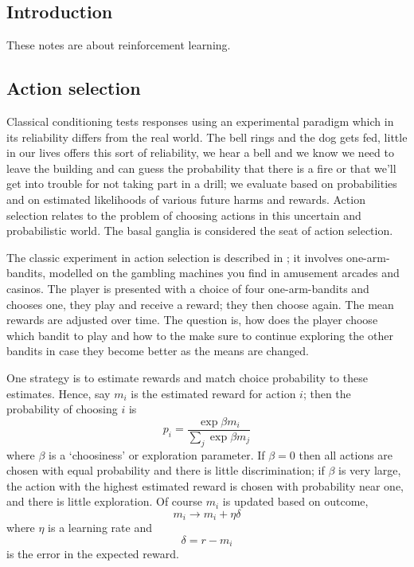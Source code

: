 \documentclass[11pt,a4paper]{scrartcl}
\begin{document}
\subsection*{Introduction}
These notes are about reinforcement learning.
\subsection*{Action selection}

Classical conditioning tests responses using an experimental paradigm
which in its reliability differs from the real world. The bell rings
and the dog gets fed, little in our lives offers this sort of
reliability, we hear a bell and we know we need to leave the building
and can guess the probability that there is a fire or that we'll get
into trouble for not taking part in a drill; we evaluate based on
probabilities and on estimated likelihoods of various future harms and
rewards. Action selection relates to the problem of choosing actions
in this uncertain and probabilistic world. The basal ganglia is
considered the seat of action selection.

The classic experiment in action selection is described in
\cite{DawEtAl2006a}; it involves one-arm-bandits, modelled on the
gambling machines you find in amusement arcades and casinos. The
player is presented with a choice of four one-arm-bandits and chooses
one, they play and receive a reward; they then choose again. The mean
rewards are adjusted over time. The question is, how does the player
choose which bandit to play and how to the make sure to continue
exploring the other bandits in case they become better as the means
are changed.

One strategy is to estimate rewards and match choice probability to
these estimates. Hence, say $m_i$ is the estimated reward for action
$i$; then the probability of choosing $i$ is
\begin{equation}
p_i=\frac{\exp{\beta m_i}}{\sum_j\exp{\beta m_j}}
\end{equation}
where $\beta$ is a \lq{}choosiness\rq{} or exploration parameter. If
$\beta=0$ then all actions are chosen with equal probability and there
is little discrimination; if $\beta$ is very large, the action with
the highest estimated reward is chosen with probability near one, and
there is little exploration. Of course $m_i$ is updated based on
outcome, 
\begin{equation}
m_i\rightarrow m_i+\eta \delta
\end{equation}
where $\eta$ is a learning rate and 
\begin{equation}
\delta = r-m_i 
\end{equation}
is the error in the expected reward.
\end{document}
